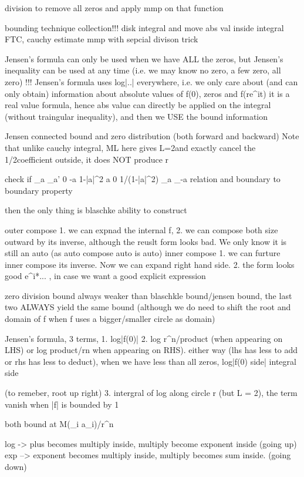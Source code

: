 {{division to remove all zeros and apply mmp on that function

bounding technique collection!!!
disk integral and move abs val inside integral
FTC, cauchy estimate
mmp with sepcial divison trick


Jensen's formula can only be used when we have ALL the zeros, but Jensen's inequality can be used at any time (i.e. we may know no zero, a few zero, all zero)
!!! Jensen's formula uses log|..| everywhere, i.e. we only care about (and can only obtain) information about absolute values of f(0), zeros and f(re^{it})
it is a real value formula, hence abs value can directly be applied on the integral (without traingular inequality), and then we USE the bound information

Jensen connected bound and zero distribution (both forward and backward)
Note that unlike cauchy integral, ML here gives L=2\pi and exactly cancel the 1/2\pi coefficient outside, it does NOT produce r



check if 
	\phi_a	\phi_a'
0	-a		1-|a|^2	
a	0		1/(1-|a|^2)
\phi_a \phi_{-a} relation 
and boundary to boundary property

then the only thing is blaschke ability to construct

outer compose
1. we can expnad the internal f, 
2. we can compose both size outward by its inverse, although the reuslt form looks bad. We only know it is still an auto (as auto compose auto is auto)
inner compose
1. we can furture inner compose its inverse. Now we can expand right hand side. 
2. the form looks good e^{i\thta}*... , in case we want a good explicit expression

zero division bound always weaker than blaschkle bound/jensen bound, the last two ALWAYS yield the same bound (although we do need to shift the root and domain of f when f uses a bigger/smaller circle as domain)

Jensen's formula, 3 terms,
1. log|f(0)|
2. log r^n/product (when appearing on LHS) or log product/rn when appearing on RHS). 
	either way (lhs has less to add or rhs has less to deduct), when we have less than all zeros, log|f(0) side| \leq integral side

	(to remeber, root up right)
3. intergral of log along circle r (but L = 2\pi), the term vanish when |f| is bounded by 1

both bound at M(\prod_i a_i)/r^n

log -> plus becomes multiply inside, multiply become exponent inside (going up)
exp --> exponent becomes multiply inside, multiply becomes sum inside. (going down)


}}

